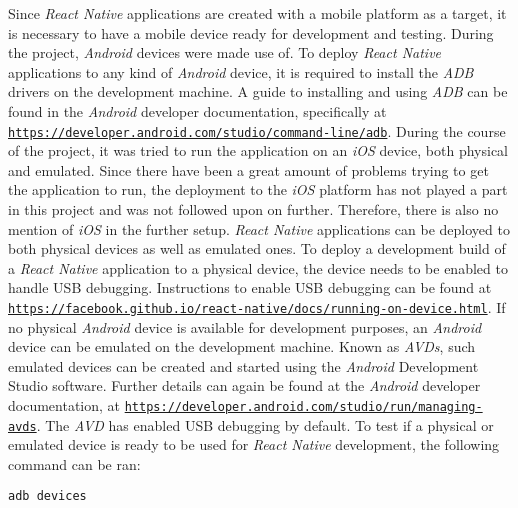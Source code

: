 Since \textit{React Native} applications are created with a mobile platform as a target, it is necessary to have a mobile device ready for development and testing. During the project, \textit{Android} devices were made use of. To deploy \textit{React Native} applications to any kind of \textit{Android} device, it is required to install the \textit{ADB} drivers on the development machine. A guide to installing and using \textit{ADB} can be found in the \textit{Android} developer documentation, specifically at \href{https://developer.android.com/studio/command-line/adb}{\nolinkurl{https://developer.android.com/studio/command-line/adb}}.
\newline
During the course of the project, it was tried to run the application on an \textit{iOS} device, both physical and emulated. Since there have been a great amount of problems trying to get the application to run, the deployment to the \textit{iOS} platform has not played a part in this project and was not followed upon on further. Therefore, there is also no mention of \textit{iOS} in the further setup.
\newline
\textit{React Native} applications can be deployed to both physical devices as well as emulated ones. To deploy a development build of a \textit{React Native} application to a physical device, the device needs to be enabled to handle USB debugging. Instructions to enable USB debugging can be found at \href{https://facebook.github.io/react-native/docs/running-on-device.html}{\nolinkurl{https://facebook.github.io/react-native/docs/running-on-device.html}}.
\newline
If no physical \textit{Android} device is available for development purposes, an \textit{Android} device can be emulated on the development machine. Known as \textit{AVDs}, such emulated devices can be created and started using the \textit{Android} Development Studio software. Further details can again be found at the \textit{Android} developer documentation, at \href{https://developer.android.com/studio/run/managing-avds}{\nolinkurl{https://developer.android.com/studio/run/managing-avds}}. The \textit{AVD} has enabled USB debugging by default.
\newline
To test if a physical or emulated device is ready to be used for \textit{React Native} development, the following command can be ran:

\begin{lstlisting}[language=bash,caption=ADB Connection Test,label=adbTest]
adb devices
\end{lstlisting}

